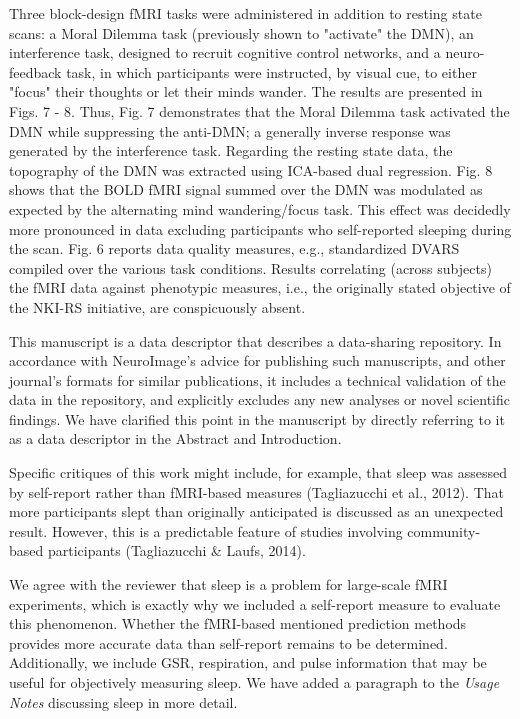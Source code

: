 \documentclass{article}
\newcommand{\RESPONSE}[1]{\textcolor{responseblue}{#1}}
\begin{document}
Three block-design fMRI tasks were administered in addition to resting state scans: a Moral Dilemma task (previously shown to "activate" the DMN), an interference task, designed to recruit cognitive control networks, and a neuro-feedback task, in which participants were instructed, by visual cue, to either "focus" their thoughts or let their minds wander. The results are presented in Figs. 7 - 8. Thus, Fig. 7 demonstrates that the Moral Dilemma task activated the DMN while suppressing the anti-DMN; a generally inverse response was generated by the interference task. Regarding the resting state data, the topography of the DMN was extracted using ICA-based dual regression. Fig. 8 shows that the BOLD fMRI signal summed over the DMN was modulated as expected by the alternating mind wandering/focus task. This effect was decidedly more pronounced in data excluding participants who self-reported sleeping during the scan. Fig. 6 reports data quality measures, e.g., standardized
DVARS compiled over the various task conditions. Results correlating (across subjects) the fMRI data against phenotypic measures, i.e., the originally stated objective of the NKI-RS initiative, are conspicuously absent.

\RESPONSE{This manuscript is a data descriptor that describes a data-sharing repository. In accordance with NeuroImage's advice for publishing such manuscripts, and other journal's formats for similar publications, it includes a technical validation of the data in the repository, and explicitly excludes any new analyses or novel scientific findings. We have clarified this point in the manuscript by directly referring to it as a data descriptor in the Abstract and Introduction.}

Specific critiques of this work might include, for example, that sleep was assessed by self-report rather than fMRI-based measures (Tagliazucchi et al., 2012). That more participants slept than originally anticipated is discussed as an unexpected result. However, this is a predictable feature of studies involving community-based participants (Tagliazucchi \& Laufs, 2014). 

\RESPONSE{We agree with the reviewer that sleep is a problem for large-scale fMRI experiments, which is exactly why we included a self-report measure to evaluate this phenomenon. Whether the fMRI-based mentioned prediction methods provides more accurate data than self-report remains to be determined. Additionally, we include GSR, respiration, and pulse information that may be useful for objectively measuring sleep. We have added a paragraph to the \emph{Usage Notes} discussing sleep in more detail.}
\end{document}
